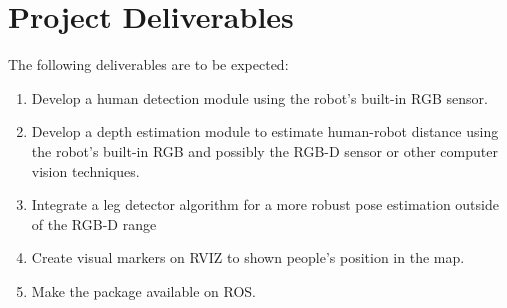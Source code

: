 \section{Project Deliverables}

The following deliverables are to be expected:

\begin{enumerate}
  \item Develop a human detection module using the robot's built-in RGB sensor.
  \item Develop a depth estimation module to estimate human-robot distance using the robot's built-in RGB and possibly the RGB-D sensor or other computer vision techniques.
  \item Integrate a leg detector algorithm for a more robust pose estimation outside of the RGB-D range
  \item Create visual markers on RVIZ to shown people's position in the map.
  \item Make the package available on ROS.
\end{enumerate}